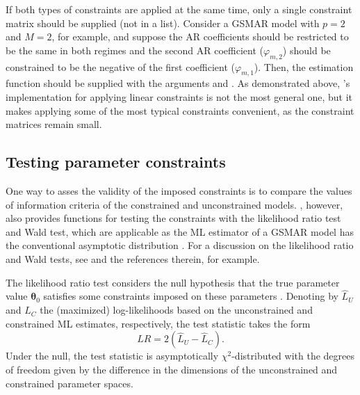 \documentclass[nojss]{jss} %
\begin{document}
If both types of constraints are applied at the same time, only a single constraint matrix should be supplied (not in a list). Consider a GSMAR model with $p=2$ and $M=2$, for example, and suppose the AR coefficients should be restricted to be the same in both regimes and the second AR coefficient ($\varphi_{m,2}$) should be constrained to be the negative of the first coefficient ($\varphi_{m,1}$). Then, the estimation function should be supplied with the arguments  and . As demonstrated above, 's implementation for applying linear constraints is not the most general one, but it makes applying some of the most typical constraints convenient, as the constraint matrices remain small.


\subsection{Testing parameter constraints}\label{sec:testconst}

One way to asses the validity of the imposed constraints is to compare the values of information criteria of the constrained and unconstrained models. , however, also provides functions for testing the constraints with the likelihood ratio test and Wald test, which are applicable as the ML estimator of a GSMAR model has the conventional asymptotic distribution \cite[as long as the model is correctly specified and one is willing to assume the validity of the required unverified assumptions, see][pp. 254-255, \citealp{Meitz+Preve+Saikkonen:2021}, Theorem 3, and \citealp{Virolainen:2020}, Theorem 2]{Kalliovirta+Meitz+Saikkonen:2015}. For a discussion on the likelihood ratio and Wald tests, see \citet{Buse:1982} and the references therein, for example.

The likelihood ratio test considers the null hypothesis that the true parameter value $\boldsymbol{\theta}_0$ satisfies some constraints imposed on these parameters \cite[such that the constrained parameter space is a subset of the parameter space, which is presented in][Section 2.2 for the GSMAR models]{Virolainen:2020}. Denoting by $\hat{L}_U$ and $\hat{L}_C$ the (maximized) log-likelihoods based on the unconstrained and constrained ML estimates, respectively, the test statistic takes the form
\begin{equation}
LR=2(\hat{L}_U - \hat{L}_C).
\end{equation}
Under the null, the test statistic is asymptotically $\chi^2$-distributed with the degrees of freedom given by the difference in the dimensions of the unconstrained and constrained parameter spaces.
\end{document}
